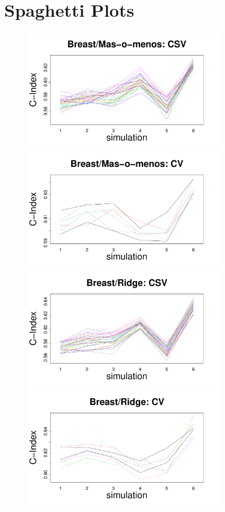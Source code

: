 \documentclass{article}
\begin{document}
\newpage
\section{Spaghetti Plots}
\begin{figure}[H]
      \centering
        \begin{minipage}[b]{0.5\textwidth}
            \includegraphics[width=8.5cm]{breast_masomenos_CSV.pdf}
        \end{minipage}%
        \begin{minipage}[b]{0.5\textwidth}
            \includegraphics[width=8.5cm]{breast_masomenos_CV.pdf}
        \end{minipage}
        \begin{minipage}[b]{0.5\textwidth}
            \includegraphics[width=8.5cm]{breast_ridge_CSV.pdf}
        \end{minipage}%
        \begin{minipage}[b]{0.5\textwidth}
            \includegraphics[width=8.5cm]{breast_ridge_CV.pdf}

\end{minipage}
\end{figure}
\end{document}
